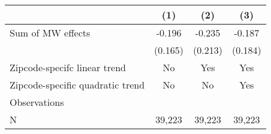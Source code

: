 {
\def\sym#1{\ifmmode^{#1}\else\(^{#1}\)\fi}
\begin{tabular}{l*{3}{c}}
\hline\hline
          &\multicolumn{1}{c}{(1)}         &\multicolumn{1}{c}{(2)}         &\multicolumn{1}{c}{(3)}         \\
\hline
Sum of MW effects&   -0.196         &   -0.235         &   -0.187         \\
          &  (0.165)         &  (0.213)         &  (0.184)         \\
\hline
Zipcode-specifc linear trend&       No         &      Yes         &      Yes         \\
Zipcode-specific quadratic trend&       No         &       No         &      Yes         \\
Observations&                  &                  &                  \\
N         &   39,223         &   39,223         &   39,223         \\
\hline\hline
\end{tabular}
}
